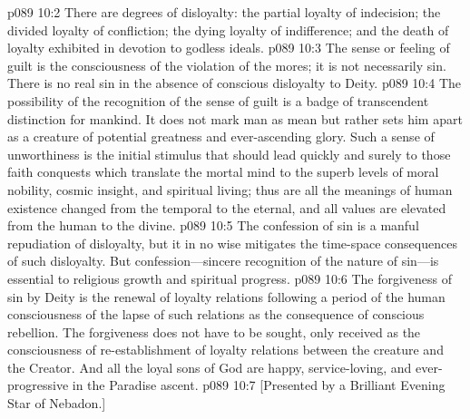 \pc \vs p089 10:2  There are degrees of disloyalty: the partial loyalty of indecision; the divided loyalty of confliction; the dying loyalty of indifference; and the death of loyalty exhibited in devotion to godless ideals.
\pc \vs p089 10:3 The sense or feeling of guilt is the consciousness of the violation of the mores; it is not necessarily sin. There is no real sin in the absence of conscious disloyalty to Deity.
\vs p089 10:4 The possibility of the recognition of the sense of guilt is a badge of transcendent distinction for mankind. It does not mark man as mean but rather sets him apart as a creature of potential greatness and ever\hyp{}ascending glory. Such a sense of unworthiness is the initial stimulus that should lead quickly and surely to those faith conquests which translate the mortal mind to the superb levels of moral nobility, cosmic insight, and spiritual living; thus are all the meanings of human existence changed from the temporal to the eternal, and all values are elevated from the human to the divine.
\vs p089 10:5 The confession of sin is a manful repudiation of disloyalty, but it in no wise mitigates the time\hyp{}space consequences of such disloyalty. But confession---sincere recognition of the nature of sin---is essential to religious growth and spiritual progress.
\vs p089 10:6 The forgiveness of sin by Deity is the renewal of loyalty relations following a period of the human consciousness of the lapse of such relations as the consequence of conscious rebellion. The forgiveness does not have to be sought, only received as the consciousness of re\hyp{}establishment of loyalty relations between the creature and the Creator. And all the loyal sons of God are happy, service\hyp{}loving, and ever\hyp{}progressive in the Paradise ascent.\plusone
\vsetoff
\vs p089 10:7 [Presented by a Brilliant Evening Star of Nebadon.]
